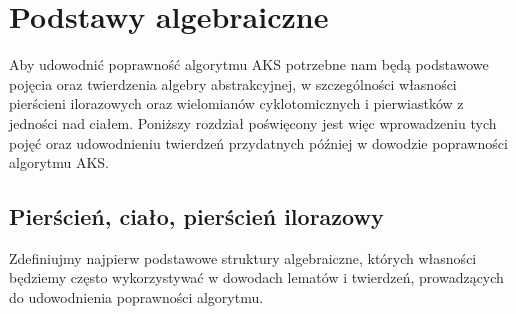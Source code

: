 \documentclass[polish,declaration,shortabstract]{iithesis}
\theoremstyle{definition}
\theoremstyle{remark} \newtheorem{observation}{Obserwacja}
\theoremstyle{plain} \newtheorem{theorem}{Twierdzenie}
\theoremstyle{plain} \newtheorem{lemma}{Lemat}
\theoremstyle{remark} \newtheorem*{remark*}{Uwaga}
\theoremstyle{reminder} \newtheorem*{reminder*}{Przypomnienie}
\begin{document}





\chapter{Podstawy algebraiczne}

Aby udowodnić poprawność algorytmu AKS potrzebne nam będą podstawowe pojęcia oraz twierdzenia algebry abstrakcyjnej, w szczególności własności pierścieni ilorazowych oraz wielomianów cyklotomicznych i pierwiastków z jedności nad ciałem. Poniższy rozdział poświęcony jest więc wprowadzeniu tych pojęć oraz udowodnieniu twierdzeń przydatnych później w dowodzie poprawności algorytmu AKS.

\section{Pierścień, ciało, pierścień ilorazowy}

Zdefiniujmy najpierw podstawowe struktury algebraiczne, których własności będziemy często wykorzystywać w dowodach lematów i twierdzeń, prowadzących do udowodnienia poprawności algorytmu.
\end{document}
